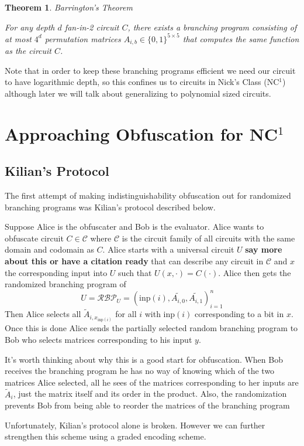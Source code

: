 \documentclass[12pt,twoside]{reedthesis}
\newtheorem{theorem}{Theorem}
\begin{document}
      
      \begin{theorem}{Barrington's Theorem}
      \par For any depth $d$ fan-in-2 circuit $C$, there exists a branching program consisting of at most $4^d$ permutation matrices $A_{i,b}\in\{0,1\}^{5 \times 5}$ that computes the same function as the circuit $C$.
      \end{theorem}
      
      
     \par Note that in order to keep these branching programs efficient we need our circuit to have logarithmic depth, so this confines us to circuits in Nick's Class (NC$^1$) although later we will talk about generalizing to polynomial sized circuits. 
     
     \section{Approaching Obfuscation for NC$^1$}
     \newcommand{\inp}[0]{\text{inp}}
     
     \subsection{Kilian's Protocol}
     The first attempt of making indistinguishability obfuscation out for randomized branching programs was Kilian's protocol described below. 
     \par Suppose Alice is the obfuscater and Bob is the evaluator. Alice wants to obfuscate circuit $C\in \mathcal{C}$ where $\mathcal{C}$ is the circuit family of all circuits with the same domain and codomain as $C$. Alice starts with a universal circuit $U$ \textbf{say more about this or have a citation ready} that can describe any circuit in $\mathcal{C}$ and $x$ the corresponding input into $U$ such that $U(x,\cdot) = C(\cdot)$. Alice then gets the randomized branching program of 
     $$U = \mathcal{RBP}_U = (\inp(i),\tilde{A_{i,0}},\tilde{A_{i,1}})_{i=1}^n$$
     Then Alice selects all $\tilde{A}_{i,x_{\inp(i)}}$ for all $i$ with $\inp(i)$ corresponding to a bit in $x$. Once this is done Alice sends the partially selected random branching program to Bob who selects matrices corresponding to his input $y$. 
     \par It's worth thinking about why this is a good start for obfuscation. When Bob receives the branching program he has no way of knowing which of the two matrices Alice selected, all he sees of the matrices corresponding to her inputs are $\tilde{A}_i$, just the matrix itself and its order in the product. Also, the randomization prevents Bob from being able to reorder the matrices of the branching program 
     \par Unfortunately, Kilian's protocol alone is broken. However we can further strengthen this scheme using a graded encoding scheme. 
    
\end{document}
